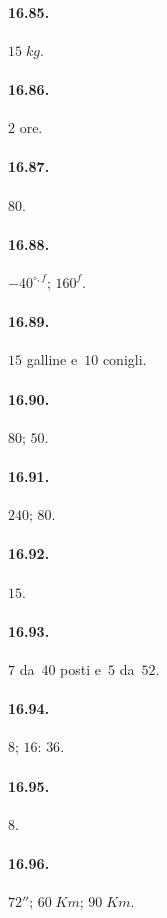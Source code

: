 \begin{multicols}{2}
\paragraph{16.85.}
$15\;\unit{kg}$.

\paragraph{16.86.}
$2$ ore.

\paragraph{16.87.}
$80$.

\paragraph{16.88.}
$-40^{\circ,f}$; $160^f$.

\paragraph{16.89.}
$15$ galline e~$10$ conigli.

\paragraph{16.90.}
$80$; $50$.

\paragraph{16.91.}
$240$; $80$.

\paragraph{16.92.}
$15$.

\paragraph{16.93.}
$7$ da~$40$ posti e~$5$ da~$52$.

\paragraph{16.94.}
$8$; $16$: $36$.

\paragraph{16.95.}
$8$.

\paragraph{16.96.}
$72''$; $60\;\unit{Km}$; $90\;\unit{Km}$.


\end{multicols}
